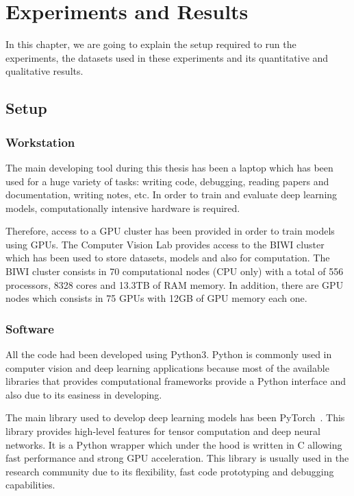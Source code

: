 
\chapter{Experiments and Results}
\label{cha:experimentsandresults}

In this chapter, we are going to explain the setup required to run the experiments,
the datasets used in these experiments and its quantitative and qualitative results.

\section{Setup}
\subsection{Workstation}

The main developing tool during this thesis has been a laptop which has been used for a huge variety of tasks: writing code, debugging, reading papers and documentation, writing notes, etc.
In order to train and evaluate deep learning models, computationally intensive hardware is required.

Therefore, access to a GPU cluster has been provided in order to train models using GPUs.
The Computer Vision Lab provides access to the BIWI cluster which has been used to store datasets, models and also for computation.
The BIWI cluster consists in 70 computational nodes (CPU only) with a total of 556 processors, 8328 cores and 13.3TB of RAM memory.
In addition, there are GPU nodes which consists in 75 GPUs with 12GB of GPU memory each one.

\subsection{Software}

All the code had been developed using Python3.
Python is commonly used in computer vision and deep learning applications because most of the available libraries that provides computational frameworks provide a Python interface and also due to its easiness in developing.

The main library used to develop deep learning models has been PyTorch~\pytorch{}.
This library provides high-level features for tensor computation and deep neural networks.
It is a Python wrapper which under the hood is written in C allowing fast performance and strong GPU acceleration.
This library is usually used in the research community due to its flexibility, fast code prototyping and debugging capabilities.

